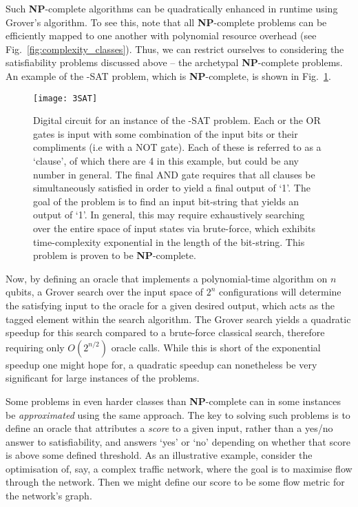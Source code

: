 Such \textbf{NP}-complete algorithms can be quadratically enhanced in runtime using Grover's algorithm. To see this, note that all \textbf{NP}-complete problems can be efficiently mapped to one another with polynomial resource overhead (see Fig.~\ref{fig:complexity_classes}). Thus, we can restrict ourselves to considering the satisfiability problems discussed above -- the archetypal \textbf{NP}-complete problems. An example of the {-SAT} problem, which is \textbf{NP}-complete, is shown in Fig.~\ref{fig:3SAT}.

\begin{figure}[!htb]
\texttt{[image: 3SAT]}
\caption{Digital circuit for an instance of the {-SAT} problem. Each or the OR gates is input with some combination of the input bits or their compliments (i.e with a NOT gate). Each of these is referred to as a `clause', of which there are 4 in this example, but could be any number in general. The final AND gate requires that all clauses be simultaneously satisfied in order to yield a final output of `1'. The goal of the problem is to find an input bit-string that yields an output of `1'. In general, this may require exhaustively searching over the entire space of input states via brute-force, which exhibits time-complexity exponential in the length of the bit-string. This problem is proven to be \textbf{NP}-complete.} \label{fig:3SAT}	
\end{figure}

Now, by defining an oracle that implements a polynomial-time algorithm on $n$ qubits, a Grover search over the input space of $2^n$ configurations will determine the satisfying input to the oracle for a given desired output, which acts as the tagged element within the search algorithm. The Grover search yields a quadratic speedup for this search compared to a brute-force classical search, therefore requiring only $O(2^{n/2})$ oracle calls. While this is short of the exponential speedup one might hope for, a quadratic speedup can nonetheless be very significant for large instances of the problems.

Some problems in even harder classes than \textbf{NP}-complete can in some instances be \textit{approximated} using the same approach. The key to solving such problems is to define an oracle that attributes a \textit{score} to a given input, rather than a yes/no answer to satisfiability, and answers `yes' or `no' depending on whether that score is above some defined threshold. As an illustrative example, consider the optimisation of, say, a complex traffic network, where the goal is to maximise flow through the network. Then we might define our score to be some flow metric for the network's graph.

